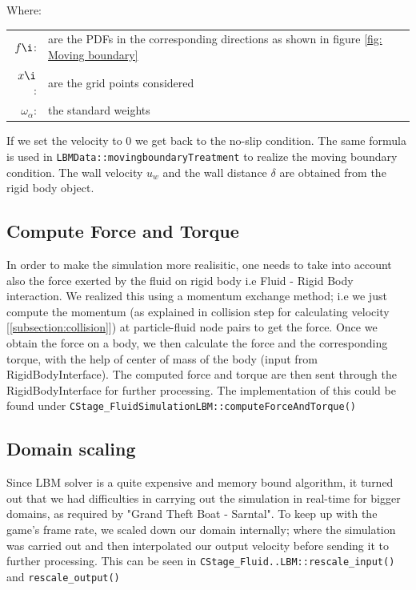 Where:\\
\hspace*{3em}
\begin{tabular}{rl}
	$f\i$:& are the PDFs in the corresponding directions as shown in figure \ref{fig: Moving boundary}  \\
	$x\i$ :& are the grid points considered \\
    $\omega_{\alpha}$:& the standard weights \\
\end{tabular}

If we set the velocity to 0 we get back to the no-slip condition. The same formula is used in \texttt{LBMData::movingboundaryTreatment} to realize the
moving boundary condition. The wall velocity $u_w$ and the wall distance $\delta$ 
are obtained from the rigid body object.

\subsection *{Compute Force and Torque}
In order to make the simulation more realisitic, one needs to take into account also the force exerted by the fluid on rigid body i.e Fluid - Rigid Body interaction. We realized this using a momentum exchange method; i.e we just compute the momentum (as explained in collision step for calculating velocity [\ref{subsection:collision}]) at particle-fluid node pairs to get the force.
Once we obtain the force on a body, we then calculate the force and the corresponding torque, with the help of center of mass of the body (input from RigidBodyInterface). The computed force and torque are then sent through the RigidBodyInterface for further processing.
The implementation of this could be found under \texttt{CStage_FluidSimulationLBM::computeForceAndTorque()}

\subsection{Domain scaling}
Since LBM solver is a quite expensive and memory bound algorithm, it turned out that
we had difficulties in carrying out the simulation in real-time for bigger domains, as required by "Grand Theft Boat - Sarntal". To keep up with the game's frame rate, we scaled down our domain internally; where the simulation was carried out and then interpolated our output velocity before sending it to further processing. This can be seen in \texttt{CStage_Fluid..LBM::rescale_input()} and \texttt{rescale_output()}



